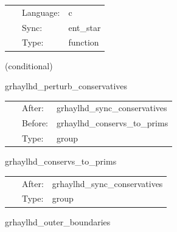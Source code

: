 \documentclass{article}
\begin{document}
\hspace{5mm}

 \begin{tabular*}{160mm}{cll} 
~ & Language:  & c \\ 
~ & Sync:  & ent\_star \\ 
~ & Type:  & function \\ 
\end{tabular*} 


\vspace{5mm}

   (conditional) 

\hspace{5mm} grhaylhd\_perturb\_conservatives 

\hspace{5mm}{\it perturb conservatives before con2prim } 


\hspace{5mm}

 \begin{tabular*}{160mm}{cll} 
~ & After:  & grhaylhd\_sync\_conservatives \\ 
~ & Before:  & grhaylhd\_conservs\_to\_prims \\ 
~ & Type:  & group \\ 
\end{tabular*} 


\vspace{5mm}


\hspace{5mm} grhaylhd\_conservs\_to\_prims 

\hspace{5mm}{\it compute primitive variables from conservatives } 


\hspace{5mm}

 \begin{tabular*}{160mm}{cll} 
~ & After:  & grhaylhd\_sync\_conservatives \\ 
~ & Type:  & group \\ 
\end{tabular*} 


\vspace{5mm}


\hspace{5mm} grhaylhd\_outer\_boundaries 

\hspace{5mm}{\it apply selected boundary conditions to the primitive variables } 
\end{document}
